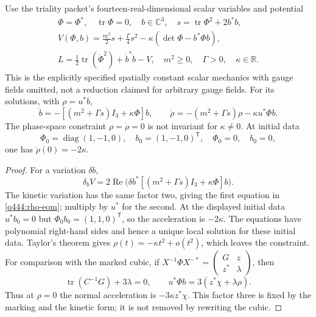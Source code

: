 \begin{theorem}\label{q444:force}
Use the triality packet's fourteen-real-dimensional scalar variables and
potential
\begin{equation}\label{q444:potential}
 \begin{gathered}
 \Phi=\Phi^*,\quad\operatorname{tr}\Phi=0,\quad b\in\mathbb C^3,
 \quad s=\operatorname{tr}\Phi^2+2b^*b,\\
 V(\Phi,b)=\frac{m^2}{2}s+\frac{\Gamma}{4}s^2
                       -\kappa(\det\Phi-b^*\Phi b),\\
 L=\tfrac12\operatorname{tr}(\dot\Phi^2)+\dot b^*\dot b-V,
 \quad m^2\geq0,\quad\Gamma>0,\quad\kappa\in\mathbb R.
 \end{gathered}
\end{equation}
This is the explicitly specified spatially constant scalar mechanics with
gauge fields omitted, not a reduction claimed for arbitrary gauge fields.
For its solutions, with $\rho=u^*b$,
\begin{equation}\label{q444:rho-eom}
 \ddot b=-[(m^2+\Gamma s)I_3+\kappa\Phi]b,
 \qquad
 \ddot\rho=-(m^2+\Gamma s)\rho-\kappa u^*\Phi b.
\end{equation}
The phase-space constraint $\rho=\dot\rho=0$ is not invariant for
$\kappa\neq0$. At initial data
\[
 \Phi_0=\operatorname{diag}(1,-1,0),\quad
 b_0=(1,-1,0)^{\mathsf T},\quad \dot\Phi_0=0,\quad\dot b_0=0,
\]
one has $\ddot\rho(0)=-2\kappa$.
\end{theorem}
\begin{proof}
For a variation $\delta b$,
\[
 \delta_bV=2\operatorname{Re}
       \bigl(\delta b^*[(m^2+\Gamma s)I_3+\kappa\Phi]b\bigr).
\]
The kinetic variation has the same factor two, giving the first equation
in \eqref{q444:rho-eom}; multiply by $u^*$ for the second.
At the displayed initial data $u^*b_0=0$ but
$\Phi_0b_0=(1,1,0)^{\mathsf T}$, so the acceleration is $-2\kappa$.
The equations have polynomial right-hand sides and hence a unique local
solution for these initial data. Taylor's theorem gives
$\rho(t)=-\kappa t^2+o(t^2)$, which leaves the constraint.
For comparison with the marked cubic, if
$X^{-1}\Phi X^{-*}=\left(\begin{smallmatrix}G&z\\z^*&\lambda\end{smallmatrix}\right)$,
then
\[
 \operatorname{tr}(C^{-1}G)+3\lambda=0,\qquad
 u^*\Phi b=3(z^*\chi+\lambda\rho).
\]
Thus at $\rho=0$ the normal acceleration is $-3\kappa z^*\chi$.
This factor three is fixed by the marking and the kinetic form; it is not
removed by rewriting the cubic.
\end{proof}

